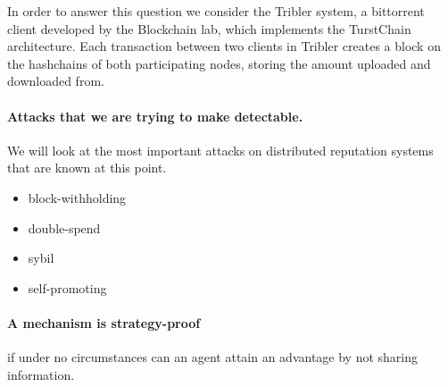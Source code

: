 In order to answer this question we consider the Tribler system, a bittorrent client developed
by the Blockchain lab, which implements the TurstChain architecture. Each transaction between two 
clients in Tribler creates a block on the hashchains of both participating nodes, storing the 
amount uploaded and downloaded from.  

\paragraph{Attacks that we are trying to make detectable.}
We will look at the most important attacks on distributed reputation systems 
that are known at this point. 

\begin{itemize}
  \item block-withholding
  \item double-spend
  \item sybil
  \item self-promoting
\end{itemize}

\paragraph{A mechanism is strategy-proof} if under no circumstances can an agent
attain an advantage by not sharing information.
